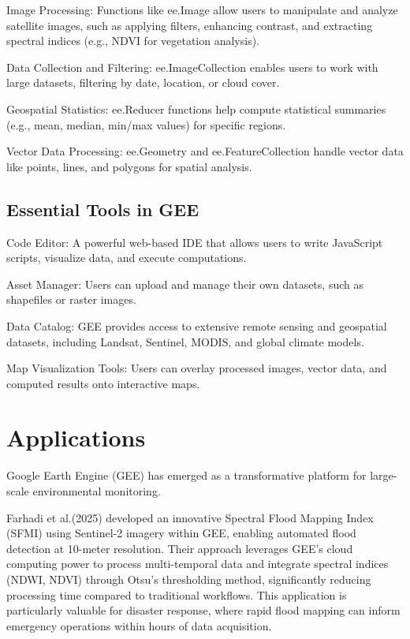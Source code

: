 \documentclass[
  letterpaper,
]{scrbook}
\begin{document}
Image Processing: Functions like ee.Image allow users to manipulate and
analyze satellite images, such as applying filters, enhancing contrast,
and extracting spectral indices (e.g., NDVI for vegetation analysis).

Data Collection and Filtering: ee.ImageCollection enables users to work
with large datasets, filtering by date, location, or cloud cover.

Geospatial Statistics: ee.Reducer functions help compute statistical
summaries (e.g., mean, median, min/max values) for specific regions.

Vector Data Processing: ee.Geometry and ee.FeatureCollection handle
vector data like points, lines, and polygons for spatial analysis.

\subsection{Essential Tools in GEE}\label{essential-tools-in-gee}

Code Editor: A powerful web-based IDE that allows users to write
JavaScript scripts, visualize data, and execute computations.

Asset Manager: Users can upload and manage their own datasets, such as
shapefiles or raster images.

Data Catalog: GEE provides access to extensive remote sensing and
geospatial datasets, including Landsat, Sentinel, MODIS, and global
climate models.

Map Visualization Tools: Users can overlay processed images, vector
data, and computed results onto interactive maps.

\section{Applications}\label{applications-3}

Google Earth Engine (GEE) has emerged as a transformative platform for
large-scale environmental monitoring.

Farhadi et al.(2025) developed an innovative Spectral Flood Mapping
Index (SFMI) using Sentinel-2 imagery within GEE, enabling automated
flood detection at 10-meter resolution. Their approach leverages GEE's
cloud computing power to process multi-temporal data and integrate
spectral indices (NDWI, NDVI) through Otsu's thresholding method,
significantly reducing processing time compared to traditional
workflows. This application is particularly valuable for disaster
response, where rapid flood mapping can inform emergency operations
within hours of data acquisition.
\end{document}
